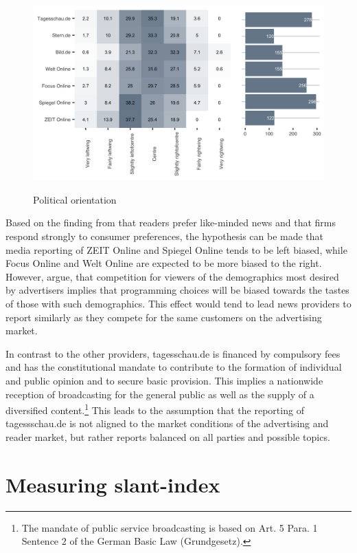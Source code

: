 \documentclass[12pt,a4paper,notitlepage]{article}
\begin{document}
\begin{figure}[H]
\begin{center}
	\caption{Political orientation }
	\includegraphics[width=.9\textwidth]{../figs/reuters3}
	\label{fig_reuters3}
	\end{center}
\end{figure}

Based on the finding from \citet{gentzkow_what_2010} that readers prefer like-minded news and that firms respond strongly to consumer preferences, the hypothesis can be made that media reporting of ZEIT Online and Spiegel Online tends to be left biased, while Focus Online and Welt Online are expected to be more biased to the right. However, \citet{anderson_media_2006} argue, that competition for viewers of the demographics most desired by advertisers implies that programming choices will be biased towards the tastes of those with such demographics. This effect would tend to lead news providers to report similarly as they compete for the same customers on the advertising market.

In contrast to the other providers, tagesschau.de is financed by compulsory fees and has the constitutional mandate to contribute to the formation of individual and public opinion and to secure basic provision. This implies a nationwide reception of broadcasting for the general public as well as the supply of a diversified content.\footnote{The mandate of public service broadcasting is based on Art. 5 Para. 1 Sentence 2 of the German Basic Law (Grundgesetz).} This leads to the assumption that the reporting of tagessschau.de is not aligned to the market conditions of the advertising and reader market, but rather reports balanced on all parties and possible topics.


\section{Measuring slant-index}\label{ch_method}
 
\end{document}
